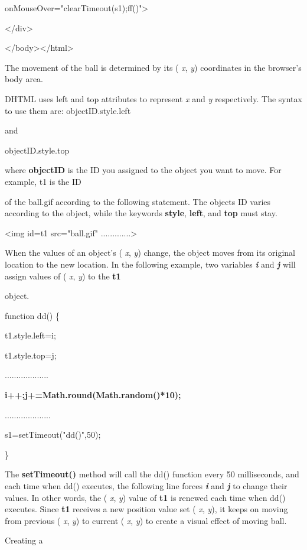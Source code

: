 \documentclass[
]{article}
\begin{document}
onMouseOver="clearTimeout(s1);ff()"\textgreater{}

\textless/div\textgreater{}

\textless/body\textgreater\textless/html\textgreater{}

The movement of the ball is determined by its ( \emph{x}, \emph{y})
coordinates in the browser's body area.

DHTML uses left and top attributes to represent \emph{x} and \emph{y}
respectively. The syntax to use them are: objectID.style.left

and

objectID.style.top

where \textbf{objectID} is the ID you assigned to the object you want to
move. For example, t1 is the ID

of the ball.gif according to the following statement. The
object\textquotesingle s ID varies according to the object, while the
keywords \textbf{style}, \textbf{left}, and \textbf{top} must stay.

\textless img id=t1 src="ball.gif" .............\textgreater{}

When the values of an object's ( \emph{x}, \emph{y}) change, the object
moves from its original location to the new location. In the following
example, two variables \emph{\textbf{i}} and \emph{\textbf{j}} will
assign values of ( \emph{x}, \emph{y}) to the \textbf{t1}

object.

function dd() \{

t1.style.left=i;

t1.style.top=j;

...................

\textbf{i++;j+=Math.round(Math.random()*10);}

....................

s1=setTimeout("dd()",50);

\}

The \textbf{setTimeout()} method will call the dd() function every 50
milliseconds, and each time when dd() executes, the following line
forces \emph{\textbf{i}} and \emph{\textbf{j}} to change their values.
In other words, the ( \emph{x}, \emph{y}) value of \textbf{t1} is
renewed each time when dd() executes. Since \textbf{t1} receives a new
position value set ( \emph{x}, \emph{y}), it keeps on moving from
previous ( \emph{x}, \emph{y}) to current ( \emph{x}, \emph{y}) to
create a visual effect of moving ball.

Creating a
\end{document}
